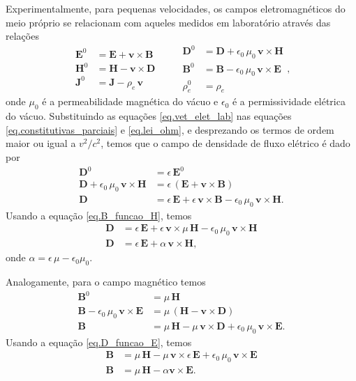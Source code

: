 Experimentalmente, para pequenas velocidades, os campos eletromagn\'eticos do meio pr\'oprio se relacionam com aqueles medidos em laborat\'orio atrav\'es das rela\c{c}\~oes 
\begin{equation}\label{eq.vet_elet_lab}
\begin{aligned}
\mathbf{E}^0&=\mathbf{E}+\mathbf{v}\times\mathbf{B}\\
\mathbf{H}^0&=\mathbf{H}-\mathbf{v}\times\mathbf{D}\\
\mathbf{J}^0&=\mathbf{J}-\rho_e\,\mathbf{v}
\end{aligned}
\qquad
\begin{aligned}
\mathbf{D}^0&=\mathbf{D}+\epsilon_0\,\mu_0\,\mathbf{v}\times\mathbf{H}\\
\mathbf{B}^0&=\mathbf{B}-\epsilon_0\,\mu_0\,\mathbf{v}\times\mathbf{E}\\
\rho_e^0&=\rho_e
\end{aligned},
\end{equation}
onde $\mu_0$ \'e a permeabilidade magn\'etica do v\'acuo e $\epsilon_0$ \'e a permissividade el\'etrica do v\'acuo. Substituindo as equa\c{c}\~oes \ref{eq.vet_elet_lab} nas equa\c{c}\~oes \ref{eq.constitutivas_parciais} e \ref{eq.lei_ohm}, e desprezando os termos de ordem maior ou igual a $v^2/c^2$, temos que o campo de densidade de fluxo el\'etrico \'e dado por
\begin{align*}
\mathbf{D}^0&=\epsilon\,\mathbf{E}^0\\
\mathbf{D}+\epsilon_0\,\mu_0\,\mathbf{v}\times\mathbf{H}&=\epsilon\,(\mathbf{E}+\mathbf{v}\times\mathbf{B})\\
\mathbf{D}&=\epsilon\,\mathbf{E}+\epsilon\,\mathbf{v}\times\mathbf{B}-\epsilon_0\,\mu_0\,\mathbf{v}\times\mathbf{H}.
\end{align*}
Usando a equa\c{c}\~ao \ref{eq.B_funcao_H}, temos
\begin{align}\label{eq.constitutiva_1}\nonumber
\mathbf{D}&=\epsilon\,\mathbf{E}+\epsilon\,\mathbf{v}\times\mu\,\mathbf{H}-\epsilon_0\,\mu_0\,\mathbf{v}\times\mathbf{H}\\
\mathbf{D}&=\epsilon\,\mathbf{E}+\alpha\,\mathbf{v}\times\mathbf{H},
\end{align}
onde $\alpha=\epsilon\,\mu-\epsilon_0\mu_0$.

Analogamente, para o campo magn\'etico temos
\begin{align*}
\mathbf{B}^0&=\mu\,\mathbf{H}\\
\mathbf{B}-\epsilon_0\,\mu_0\,\mathbf{v}\times\mathbf{E}&=\mu\,(\mathbf{H}-\mathbf{v}\times\mathbf{D})\\
\mathbf{B}&=\mu\,\mathbf{H}-\mu\,\mathbf{v}\times\mathbf{D}+\epsilon_0\,\mu_0\,\mathbf{v}\times\mathbf{E}.
\end{align*}
Usando a equa\c{c}\~ao \ref{eq.D_funcao_E}, temos
\begin{align}\label{eq.constitutiva_2}\nonumber
\mathbf{B}&=\mu\,\mathbf{H}-\mu\,\mathbf{v}\times\epsilon\,\mathbf{E}+\epsilon_0\,\mu_0\,\mathbf{v}\times\mathbf{E}\\
\mathbf{B}&=\mu\,\mathbf{H}-\alpha\mathbf{v}\times\mathbf{E}.
\end{align}

